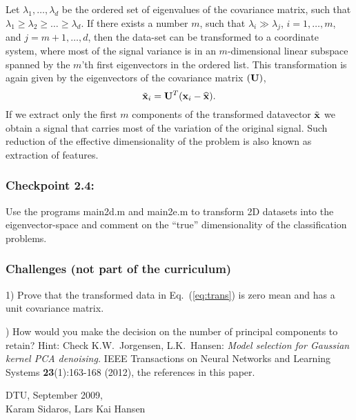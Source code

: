 \documentclass[times,12pt]{article}    %
\def\x{{\bf x}}
\def\U{{\bf U}}
\begin{document}
Let $\lambda_1, \ldots, \lambda_d$ be the ordered set of eigenvalues
of the covariance matrix, such that $\lambda_1 \ge \lambda_2 \ge \ldots
\ge \lambda_d$. If there exists a number $m$, such that $\lambda_i \gg
\lambda_j$, $i = 1,\ldots,m$, and $j=m+1,\ldots,d$, then the data-set
can be transformed to a coordinate system, where most of the
signal variance is in an $m$-dimensional linear subspace  spanned by the $m$'th  first eigenvectors
in the ordered list. This transformation is again given by the eigenvectors of the
covariance matrix $(\U)$,
\begin{equation}
  \label{eq:trans2}
  \tilde{\x}_i= \U^T(\x_i-\widehat{\x}).
\end{equation}
If we extract only the first $m$ components of the transformed datavector $\tilde{\x}$
we obtain a signal that carries most of the variation of the original signal.
Such reduction of the effective dimensionality of the problem is also known
as extraction of features.

\subsubsection*{Checkpoint 2.4:}
Use the programs {\sf main2d.m} and {\sf main2e.m} to transform 2D
datasets into the eigenvector-space and comment on the ``true'' dimensionality
of the classification problems.

\subsubsection*{Challenges (not part of the curriculum)}
1) Prove that the transformed data in Eq.\ (\ref{eq:trans}) is zero mean and has a unit covariance matrix.

) How would you make the decision on the number of principal components to retain? Hint: Check  K.W.\ Jorgensen, L.K.\ Hansen: {\it Model selection for Gaussian kernel PCA denoising.} IEEE Transactions on Neural Networks and Learning Systems  {\bf 23}(1):163-168 (2012), the references in this paper.

\vspace*{2cm}
\noindent DTU, September 2009,\\[2mm]
Karam Sidaros, Lars Kai Hansen
\end{document}
